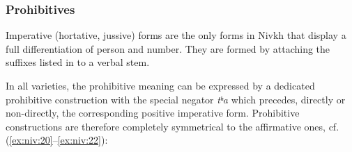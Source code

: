 \documentclass[output=paper,colorlinks,citecolor=brown]{langscibook}
\begin{document}
\subsubsection{Prohibitives}\label{sec:niv:2.2.1} 

Imperative (hortative, jussive) forms are the only forms in Nivkh that display a full differentiation of person and number. They are formed by attaching the suffixes listed in  to a verbal stem.


\begin{table}

%
\caption{Imperative suffixes in Nivkh}
\label{tab:niv:1}
\end{table}


In all varieties, the prohibitive meaning can be expressed by a dedicated prohibitive construction with the special negator \textit{tʰa} which precedes, directly or non-directly, the corresponding positive imperative form. Prohibitive constructions are therefore completely symmetrical to the affirmative ones, cf. (\ref{ex:niv:20}--\ref{ex:niv:22}):

\end{document}
